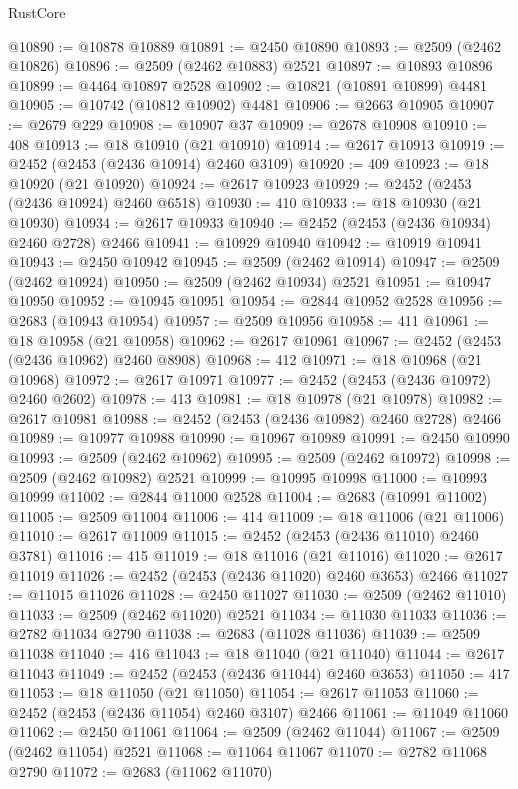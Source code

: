 \begin{lexlean}{RustCore}
\begin{coremodule}
@10890 := @10878 @10889
@10891 := @2450 @10890
@10893 := @2509 (@2462 @10826)
@10896 := @2509 (@2462 @10883) @2521
@10897 := @10893 @10896
@10899 := @4464 @10897 @2528
@10902 := @10821 (@10891 @10899) @4481
@10905 := @10742 (@10812 @10902) @4481
@10906 := @2663 @10905
@10907 := @2679 @229
@10908 := @10907 @37
@10909 := @2678 @10908
@10910 := 408
@10913 := @18 @10910 (@21 @10910)
@10914 := @2617 @10913
@10919 := @2452 (@2453 (@2436 @10914) @2460 @3109)
@10920 := 409
@10923 := @18 @10920 (@21 @10920)
@10924 := @2617 @10923
@10929 := @2452 (@2453 (@2436 @10924) @2460 @6518)
@10930 := 410
@10933 := @18 @10930 (@21 @10930)
@10934 := @2617 @10933
@10940 := @2452 (@2453 (@2436 @10934) @2460 @2728) @2466
@10941 := @10929 @10940
@10942 := @10919 @10941
@10943 := @2450 @10942
@10945 := @2509 (@2462 @10914)
@10947 := @2509 (@2462 @10924)
@10950 := @2509 (@2462 @10934) @2521
@10951 := @10947 @10950
@10952 := @10945 @10951
@10954 := @2844 @10952 @2528
@10956 := @2683 (@10943 @10954)
@10957 := @2509 @10956
@10958 := 411
@10961 := @18 @10958 (@21 @10958)
@10962 := @2617 @10961
@10967 := @2452 (@2453 (@2436 @10962) @2460 @8908)
@10968 := 412
@10971 := @18 @10968 (@21 @10968)
@10972 := @2617 @10971
@10977 := @2452 (@2453 (@2436 @10972) @2460 @2602)
@10978 := 413
@10981 := @18 @10978 (@21 @10978)
@10982 := @2617 @10981
@10988 := @2452 (@2453 (@2436 @10982) @2460 @2728) @2466
@10989 := @10977 @10988
@10990 := @10967 @10989
@10991 := @2450 @10990
@10993 := @2509 (@2462 @10962)
@10995 := @2509 (@2462 @10972)
@10998 := @2509 (@2462 @10982) @2521
@10999 := @10995 @10998
@11000 := @10993 @10999
@11002 := @2844 @11000 @2528
@11004 := @2683 (@10991 @11002)
@11005 := @2509 @11004
@11006 := 414
@11009 := @18 @11006 (@21 @11006)
@11010 := @2617 @11009
@11015 := @2452 (@2453 (@2436 @11010) @2460 @3781)
@11016 := 415
@11019 := @18 @11016 (@21 @11016)
@11020 := @2617 @11019
@11026 := @2452 (@2453 (@2436 @11020) @2460 @3653) @2466
@11027 := @11015 @11026
@11028 := @2450 @11027
@11030 := @2509 (@2462 @11010)
@11033 := @2509 (@2462 @11020) @2521
@11034 := @11030 @11033
@11036 := @2782 @11034 @2790
@11038 := @2683 (@11028 @11036)
@11039 := @2509 @11038
@11040 := 416
@11043 := @18 @11040 (@21 @11040)
@11044 := @2617 @11043
@11049 := @2452 (@2453 (@2436 @11044) @2460 @3653)
@11050 := 417
@11053 := @18 @11050 (@21 @11050)
@11054 := @2617 @11053
@11060 := @2452 (@2453 (@2436 @11054) @2460 @3107) @2466
@11061 := @11049 @11060
@11062 := @2450 @11061
@11064 := @2509 (@2462 @11044)
@11067 := @2509 (@2462 @11054) @2521
@11068 := @11064 @11067
@11070 := @2782 @11068 @2790
@11072 := @2683 (@11062 @11070)

\end{coremodule}
\end{lexlean}
